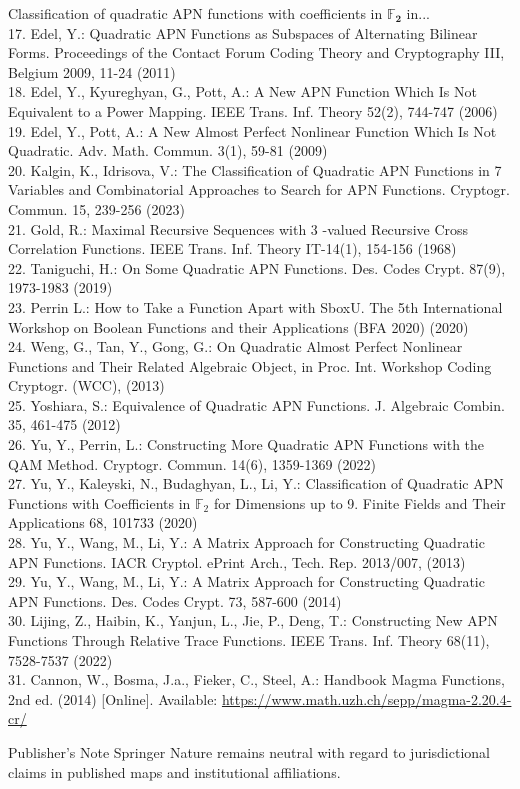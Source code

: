 \documentclass[10pt]{article}
\begin{document}
Classification of quadratic APN functions with coefficients in $\mathbb{F}_{\mathbf{2}}$ in...\\
17. Edel, Y.: Quadratic APN Functions as Subspaces of Alternating Bilinear Forms. Proceedings of the Contact Forum Coding Theory and Cryptography III, Belgium 2009, 11-24 (2011)\\
18. Edel, Y., Kyureghyan, G., Pott, A.: A New APN Function Which Is Not Equivalent to a Power Mapping. IEEE Trans. Inf. Theory 52(2), 744-747 (2006)\\
19. Edel, Y., Pott, A.: A New Almost Perfect Nonlinear Function Which Is Not Quadratic. Adv. Math. Commun. 3(1), 59-81 (2009)\\
20. Kalgin, K., Idrisova, V.: The Classification of Quadratic APN Functions in 7 Variables and Combinatorial Approaches to Search for APN Functions. Cryptogr. Commun. 15, 239-256 (2023)\\
21. Gold, R.: Maximal Recursive Sequences with 3 -valued Recursive Cross Correlation Functions. IEEE Trans. Inf. Theory IT-14(1), 154-156 (1968)\\
22. Taniguchi, H.: On Some Quadratic APN Functions. Des. Codes Crypt. 87(9), 1973-1983 (2019)\\
23. Perrin L.: How to Take a Function Apart with SboxU. The 5th International Workshop on Boolean Functions and their Applications (BFA 2020) (2020)\\
24. Weng, G., Tan, Y., Gong, G.: On Quadratic Almost Perfect Nonlinear Functions and Their Related Algebraic Object, in Proc. Int. Workshop Coding Cryptogr. (WCC), (2013)\\
25. Yoshiara, S.: Equivalence of Quadratic APN Functions. J. Algebraic Combin. 35, 461-475 (2012)\\
26. Yu, Y., Perrin, L.: Constructing More Quadratic APN Functions with the QAM Method. Cryptogr. Commun. 14(6), 1359-1369 (2022)\\
27. Yu, Y., Kaleyski, N., Budaghyan, L., Li, Y.: Classification of Quadratic APN Functions with Coefficients in $\mathbb{F}_{2}$ for Dimensions up to 9. Finite Fields and Their Applications 68, 101733 (2020)\\
28. Yu, Y., Wang, M., Li, Y.: A Matrix Approach for Constructing Quadratic APN Functions. IACR Cryptol. ePrint Arch., Tech. Rep. 2013/007, (2013)\\
29. Yu, Y., Wang, M., Li, Y.: A Matrix Approach for Constructing Quadratic APN Functions. Des. Codes Crypt. 73, 587-600 (2014)\\
30. Lijing, Z., Haibin, K., Yanjun, L., Jie, P., Deng, T.: Constructing New APN Functions Through Relative Trace Functions. IEEE Trans. Inf. Theory 68(11), 7528-7537 (2022)\\[0pt]
31. Cannon, W., Bosma, J.a., Fieker, C., Steel, A.: Handbook Magma Functions, 2nd ed. (2014) [Online]. Available: \href{https://www.math.uzh.ch/sepp/magma-2.20.4-cr/}{https://www.math.uzh.ch/sepp/magma-2.20.4-cr/}

Publisher's Note Springer Nature remains neutral with regard to jurisdictional claims in published maps and institutional affiliations.
\end{document}
